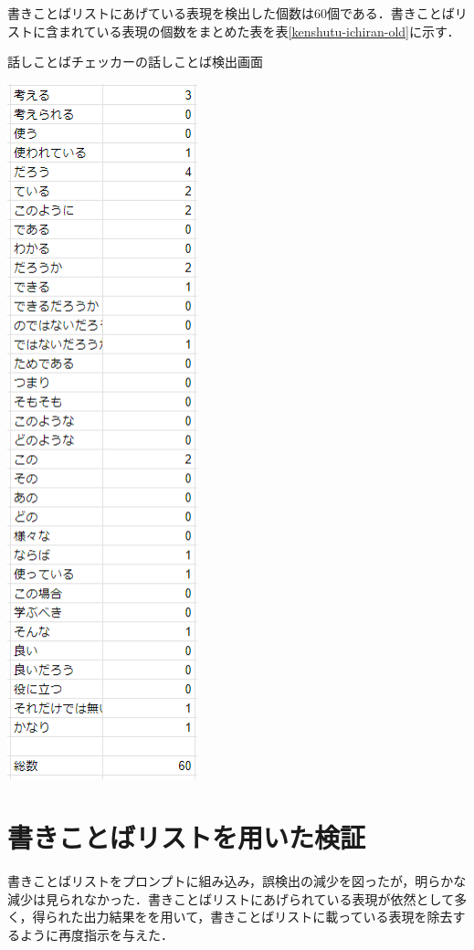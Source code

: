 書きことばリストにあげている表現を検出した個数は60個である．書きことばリストに含まれている表現の個数をまとめた表を表\ref{kenshutu-ichiran-old}に示す．

\begin{table}[H]
	\centering
        \caption{話しことばチェッカーの話しことば検出画面}
 	\includegraphics[width=55mm]{image/kenshutu-ichiran-old.png}
	\label{kenshutu-ichiran-old}
\end{table}

\section{書きことばリストを用いた検証 \label{c7os2}}
書きことばリストをプロンプトに組み込み，誤検出の減少を図ったが，明らかな減少は見られなかった．書きことばリストにあげられている表現が依然として多く，得られた出力結果をを用いて，書きことばリストに載っている表現を除去するように再度指示を与えた．

